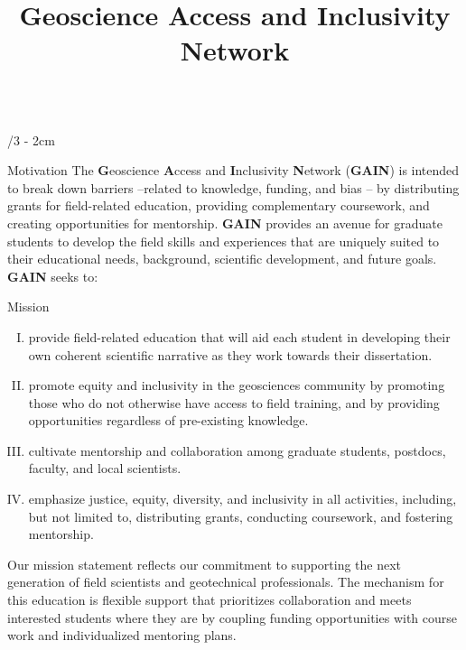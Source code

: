 \documentclass[landscape]{uwposter}
\title{Geoscience Access and Inclusivity Network}
\begin{document}
\begin{frame}
\begin{columns}[onlytextwidth]




\begin{column}{\textwidth/3 - 2cm}
    \begin{block}{Motivation}
       The \textbf{\alert{G}}eoscience \textbf{\alert{A}}ccess and \textbf{\alert{I}}nclusivity \textbf{\alert{N}}etwork (\textbf{\alert{GAIN}}) is intended to break down barriers –related to knowledge, funding, and bias – by distributing grants for field-related education, providing complementary coursework, and creating opportunities for mentorship.
   	\textbf{\alert{GAIN}} provides an avenue for graduate students to develop the field skills and experiences that are uniquely suited to their educational needs, background, scientific development, and future goals.
	 \textbf{\alert{GAIN}} seeks to:
    \end{block}

    \begin{block}{Mission}
         \begin{enumerate}[I.]
         \item
    	provide field-related education that will aid each student in developing their own coherent scientific narrative as they work towards their dissertation.
    	\item
	promote equity and inclusivity in the geosciences community by promoting those who do not otherwise have access to field training, and by providing opportunities regardless of pre-existing knowledge.
    	\item
	cultivate mentorship and collaboration among graduate students, postdocs, faculty, and local scientists.
    	\item
	emphasize justice, equity, diversity, and inclusivity in all activities, including, but not limited to, distributing grants, conducting coursework, and fostering mentorship.
	\end{enumerate}
	Our mission statement reflects our commitment to supporting the next generation of field scientists and geotechnical professionals.
        The mechanism for this education is flexible support that prioritizes collaboration and meets interested students where they are by coupling funding opportunities with course work and individualized mentoring plans.

    \end{block}
\end{column}



\end{columns}
\end{frame}
\end{document}
